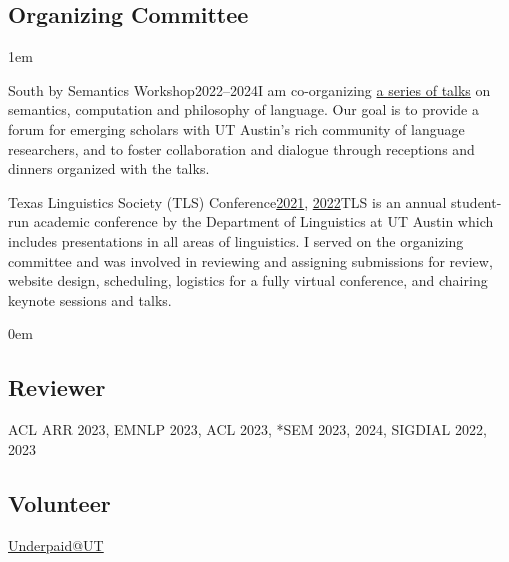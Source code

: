 \subsection{Organizing Committee}

\leftskip1em\relax

\smallentry
  {\large South by Semantics Workshop}{2022--2024}{I am co-organizing \href{https://sites.utexas.edu/sxsemantics/}{a series of talks} on semantics, computation and philosophy of language. Our goal is to provide a forum for emerging scholars with UT Austin's rich community of language researchers, and to foster collaboration and dialogue through receptions and dinners organized with the talks.}
  
\smallentry
    {\large Texas Linguistics Society (TLS) Conference}{\href{http://tls.ling.utexas.edu/2021/}{2021}, \href{http://tls.ling.utexas.edu/2022/}{2022}}{TLS is an annual student-run academic conference by the Department of Linguistics at UT Austin which includes presentations in all areas of linguistics. I served on the organizing committee and was involved in reviewing and assigning submissions for review, website design, scheduling, logistics for a fully virtual conference, and chairing keynote sessions and talks.}

\leftskip0em\relax

\subsection{Reviewer}

\quad ACL ARR 2023, EMNLP 2023, ACL 2023, *SEM 2023, 2024, SIGDIAL 2022, 2023

\subsection{Volunteer}

\quad \href{http://underpaidatut.org}{Underpaid\makeatletter @\makeatother UT}
